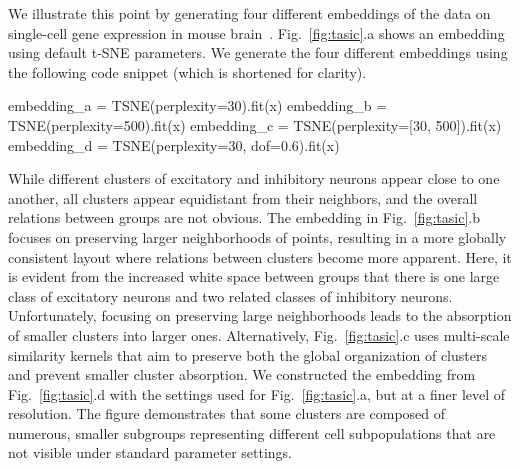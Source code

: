 \documentclass[article]{jss}
\begin{document}
We illustrate this point by generating four different embeddings of the data on single-cell gene expression in mouse brain~\citep{tasic2018shared}. Fig.~\ref{fig:tasic}.a shows an embedding using default t-SNE parameters.
We generate the four different embeddings using the following code snippet (which is shortened for clarity).
\begin{CodeChunk}
\begin{CodeInput}
embedding_a = TSNE(perplexity=30).fit(x)
embedding_b = TSNE(perplexity=500).fit(x)
embedding_c = TSNE(perplexity=[30, 500]).fit(x)
embedding_d = TSNE(perplexity=30, dof=0.6).fit(x)
\end{CodeInput}
\end{CodeChunk}
While different clusters of excitatory and inhibitory neurons appear close to one another, all clusters appear equidistant from their neighbors, and the overall relations between groups are not obvious. The embedding in Fig.~\ref{fig:tasic}.b focuses on preserving larger neighborhoods of points, resulting in a more globally consistent layout where relations between clusters become more apparent. Here, it is evident from the increased white space between groups that there is one large class of excitatory neurons and two related classes of inhibitory neurons. Unfortunately, focusing on preserving large neighborhoods leads to the absorption of smaller clusters into larger ones. Alternatively, Fig.~\ref{fig:tasic}.c uses multi-scale similarity kernels that aim to preserve both the global organization of clusters and prevent smaller cluster absorption. We constructed the embedding from Fig.~\ref{fig:tasic}.d with the settings used for Fig.~\ref{fig:tasic}.a, but at a finer level of resolution. The figure demonstrates that some clusters are composed of numerous, smaller subgroups representing different cell subpopulations that are not visible under standard parameter settings.
\end{document}
